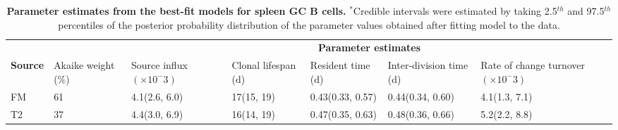\documentclass[11pt]{article}
\begin{document}
	\begin{table}[h!]
		\begin{center}
			\renewcommand{\arraystretch}{1.25}
			\begin{tabular}{p{1cm} p{1cm} p{2cm} p{2cm} p{2.4cm} p{2.4cm} p{2.2cm}} 
				\toprule 
				&        & \multicolumn{5}{c}{\textbf{Parameter estimates}} \\
				\cline{3-7}
				\textbf{Source} &   Akaike weight (\%)   & {\small Source influx $(\times 10^-3)$}&  {\small Clonal lifespan (d)}    & {\small Resident time (d)}& {\small Inter-division time (d)}  & {\small Rate of change turnover $(\times 10^-3)$} \\ 
				\toprule
				FM    &   61    &      4.1(2.6, 6.0)   &   17(15, 19)   &  0.43(0.33, 0.57)  &  0.44(0.34, 0.60)  & 4.1(1.3, 7.1)     \\ 
				T2    &   37    &      4.4(3.0, 6.9)   &   16(14, 19)   &  0.47(0.35, 0.63)  &  0.48(0.36, 0.66)  & 5.2(2.2, 8.8)     \\ 
				\hline
				\toprule 
			\end{tabular}
		\end{center}
		\caption{\small \textbf{Parameter estimates from the best-fit models for spleen GC B cells.}  $^{\ast}$Credible intervals were estimated by taking 2.5$^{th}$ and 97.5$^{th}$ percentiles of the posterior probability distribution of the parameter values obtained after fitting model to the data.}
		\label{tab:GC-parestm}
	\end{table} 
	
	\vspace{1cm}
	
\end{document}
